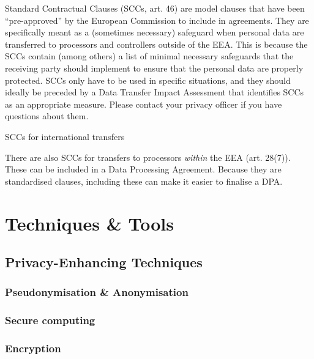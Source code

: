 \documentclass[
]{book}
\begin{document}
Standard Contractual Clauses (SCCs,
art. 46) are
model clauses that have been
``pre-approved'' by the European Commission
to include in agreements. They are specifically meant as a (sometimes necessary)
safeguard when personal data are transferred to processors and controllers
outside of the EEA. This is because the SCCs contain (among others) a list of
minimal necessary safeguards that the receiving party should implement to ensure
that the personal data are properly protected. SCCs only have to be used in
specific situations, and they should ideally be preceded by a
Data Transfer Impact Assessment that identifies SCCs as an
appropriate measure. Please contact your
privacy officer
if you have questions about them.

SCCs for international transfers

There are also SCCs for transfers to processors \emph{within} the EEA
(art. 28(7)).
These can be included in a
Data Processing Agreement. Because they
are standardised clauses, including these can make it easier to finalise a DPA.

\hypertarget{part-techniques-tools}{%
\part*{Techniques \& Tools}\label{part-techniques-tools}}

\hypertarget{privacy-enchancing-techniques}{%
\chapter{Privacy-Enhancing Techniques}\label{privacy-enchancing-techniques}}

\hypertarget{pseudonymisation-anonymisation}{%
\section{Pseudonymisation \& Anonymisation}\label{pseudonymisation-anonymisation}}

\hypertarget{secure-computing}{%
\section{Secure computing}\label{secure-computing}}

\hypertarget{encryption}{%
\section{Encryption}\label{encryption}}
\end{document}
